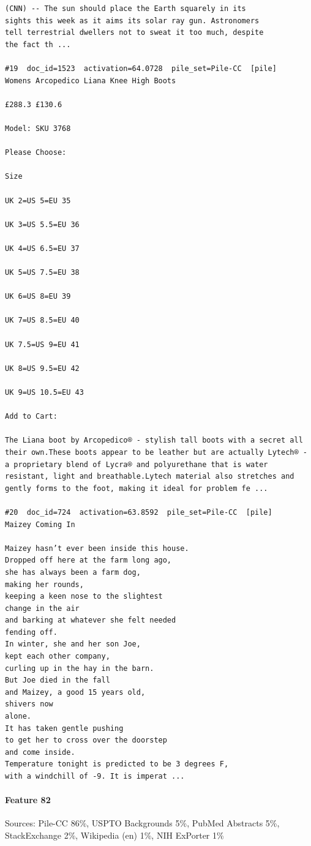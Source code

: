 \begin{verbatim}
(CNN) -- The sun should place the Earth squarely in its
sights this week as it aims its solar ray gun. Astronomers
tell terrestrial dwellers not to sweat it too much, despite
the fact th ...

#19  doc_id=1523  activation=64.0728  pile_set=Pile-CC  [pile]
Womens Arcopedico Liana Knee High Boots

£288.3 £130.6

Model: SKU 3768

Please Choose:

Size

UK 2=US 5=EU 35

UK 3=US 5.5=EU 36

UK 4=US 6.5=EU 37

UK 5=US 7.5=EU 38

UK 6=US 8=EU 39

UK 7=US 8.5=EU 40

UK 7.5=US 9=EU 41

UK 8=US 9.5=EU 42

UK 9=US 10.5=EU 43

Add to Cart:

The Liana boot by Arcopedico® - stylish tall boots with a secret all their own.These boots appear to be leather but are actually Lytech® - a proprietary blend of Lycra® and polyurethane that is water resistant, light and breathable.Lytech material also stretches and gently forms to the foot, making it ideal for problem fe ...

#20  doc_id=724  activation=63.8592  pile_set=Pile-CC  [pile]
Maizey Coming In

Maizey hasn’t ever been inside this house.
Dropped off here at the farm long ago,
she has always been a farm dog,
making her rounds,
keeping a keen nose to the slightest
change in the air
and barking at whatever she felt needed
fending off.
In winter, she and her son Joe,
kept each other company,
curling up in the hay in the barn.
But Joe died in the fall
and Maizey, a good 15 years old,
shivers now
alone.
It has taken gentle pushing
to get her to cross over the doorstep
and come inside.
Temperature tonight is predicted to be 3 degrees F,
with a windchill of -9. It is imperat ...

\end{verbatim}

\paragraph*{Feature 82} Sources: Pile-CC 86\%, USPTO Backgrounds 5\%, PubMed Abstracts 5\%, StackExchange 2\%, Wikipedia (en) 1\%, NIH ExPorter 1\%

